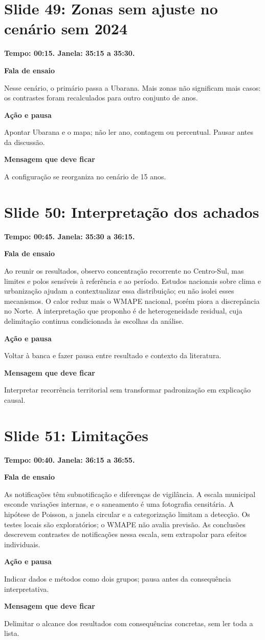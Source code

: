 \documentclass[11pt,a4paper]{article}
\newcommand{\bloco}[1]{\par\Needspace{3\baselineskip}\textbf{#1}\par}
\newcommand{\slide}[2]{\Needspace{13\baselineskip}\section*{Slide #1: #2}}
\begin{document}
\par\begin{minipage}{\textwidth}
\slide{49}{Zonas sem ajuste no cenário sem 2024}
{\color{azul}\textbf{Tempo: 00:15. Janela: 35:15 a 35:30.}}\par
\bloco{Fala de ensaio}
Nesse cenário, o primário passa a Ubarana. Mais zonas não significam mais casos: os contrastes foram recalculados para outro conjunto de anos.
\bloco{Ação e pausa}
Apontar Ubarana e o mapa; não ler ano, contagem ou percentual. Pausar antes da discussão.
\bloco{Mensagem que deve ficar}
A configuração se reorganiza no cenário de 15 anos.
\end{minipage}\par\bigskip
\par\begin{minipage}{\textwidth}
\slide{50}{Interpretação dos achados}
{\color{azul}\textbf{Tempo: 00:45. Janela: 35:30 a 36:15.}}\par
\bloco{Fala de ensaio}
Ao reunir os resultados, observo concentração recorrente no Centro-Sul, mas limites e polos sensíveis à referência e ao período. Estudos nacionais sobre clima e urbanização ajudam a contextualizar essa distribuição; eu não isolei esses mecanismos. O calor reduz mais o WMAPE nacional, porém piora a discrepância no Norte. A interpretação que proponho é de heterogeneidade residual, cuja delimitação continua condicionada às escolhas da análise.
\bloco{Ação e pausa}
Voltar à banca e fazer pausa entre resultado e contexto da literatura.
\bloco{Mensagem que deve ficar}
Interpretar recorrência territorial sem transformar padronização em explicação causal.
\end{minipage}\par\bigskip
\par\begin{minipage}{\textwidth}
\slide{51}{Limitações}
{\color{azul}\textbf{Tempo: 00:40. Janela: 36:15 a 36:55.}}\par
\bloco{Fala de ensaio}
As notificações têm subnotificação e diferenças de vigilância. A escala municipal esconde variações internas, e o saneamento é uma fotografia censitária. A hipótese de Poisson, a janela circular e a categorização limitam a detecção. Os testes locais são exploratórios; o WMAPE não avalia previsão. As conclusões descrevem contrastes de notificações nessa escala, sem extrapolar para efeitos individuais.
\bloco{Ação e pausa}
Indicar dados e métodos como dois grupos; pausa antes da consequência interpretativa.
\bloco{Mensagem que deve ficar}
Delimitar o alcance dos resultados com consequências concretas, sem ler toda a lista.
\end{minipage}\par\bigskip
\end{document}
